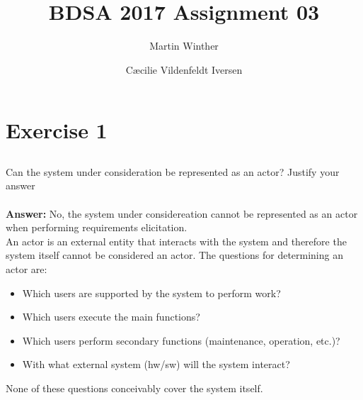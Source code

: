 \documentclass[a4paper]{article}
\title{BDSA 2017 Assignment 03}
\author{Martin Winther \and Cæcilie Vildenfeldt Iversen}
\begin{document}
\maketitle

\section{Exercise 1}

\subsection{}
Can the system under consideration be represented as an actor? Justify your answer\\
\\
\textbf{Answer:} No, the system under considereation cannot be represented as an actor when performing requirements elicitation. \\
An actor is an external entity that interacts with the system and therefore the system itself cannot be considered an actor. 
The questions for determining an actor are:
\begin{itemize}
\item Which users are supported by the system to perform work? 
\item Which users execute the main functions? 
\item Which users perform secondary functions (maintenance, operation, etc.)? 
\item With what external system (hw/sw) will the system interact?
\end{itemize}
None of these questions conceivably cover the system itself.
\end{document}
